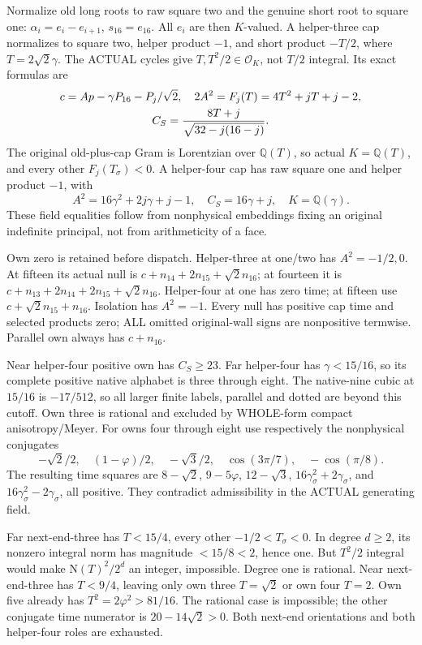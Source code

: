 \documentclass[11pt]{article}
\begin{document}
Normalize old long roots to raw square two and
the genuine short root to square one:
\(\alpha_i=e_i-e_{i+1}\), \(s_{16}=e_{16}\).
All \(e_i\) are then \(K\)-valued.
A helper-three cap normalizes to square two,
helper product \(-1\), and short product \(-T/2\),
where \(T=2\sqrt2\gamma\).
The ACTUAL cycles give
\(T,T^2/2\in\mathcal O_K\), not \(T/2\) integral.
Its exact formulas are
\[
 \begin{gathered}
 c=Ap-\gamma P_{16}-P_j/\sqrt2,\quad
 2A^2=F_j(T)=4T^2+jT+j-2,\\
 C_S={8T+j\over\sqrt{32-j(16-j)}} .
 \end{gathered}
\]
The original old-plus-cap Gram is Lorentzian over
\(\mathbb Q(T)\), so actual \(K=\mathbb Q(T)\),
and every other \(F_j(T_\sigma)<0\).
A helper-four cap has raw square one and helper
product \(-1\), with
\[
       A^2=16\gamma^2+2j\gamma+j-1,\quad
       C_S=16\gamma+j,\quad K=\mathbb Q(\gamma).
\]
These field equalities follow from nonphysical
embeddings fixing an original indefinite principal,
not from arithmeticity of a face.

Own zero is retained before dispatch.
Helper-three at one/two has \(A^2=-1/2,0\).
At fifteen its actual null is
\(c+n_{14}+2n_{15}+\sqrt2n_{16}\);
at fourteen it is
\(c+n_{13}+2n_{14}+2n_{15}+\sqrt2n_{16}\).
Helper-four at one has zero time;
at fifteen use \(c+\sqrt2n_{15}+n_{16}\).
Isolation has \(A^2=-1\).
Every null has positive cap time and selected
products zero; ALL omitted original-wall signs
are nonpositive termwise.
Parallel own always has \(c+n_{16}\).

Near helper-four positive own has \(C_S\ge23\).
Far helper-four has \(\gamma<15/16\), so its
complete positive native alphabet is
three through eight.
The native-nine cubic at \(15/16\) is
\(-17/512\), so all larger finite labels, parallel
and dotted are beyond this cutoff.
Own three is rational and excluded by WHOLE-form
compact anisotropy/Meyer.
For owns four through eight use respectively
the nonphysical conjugates
\[
 -\sqrt2/2,\quad(1-\varphi)/2,\quad-\sqrt3/2,\quad
 \cos(3\pi/7),\quad-\cos(\pi/8).
\]
The resulting time squares are
\(8-\sqrt2\), \(9-5\varphi\), \(12-\sqrt3\),
\(16\gamma_\sigma^2+2\gamma_\sigma\), and
\(16\gamma_\sigma^2-2\gamma_\sigma\), all positive.
They contradict admissibility in the ACTUAL
generating field.

Far next-end-three has
\(T<15/4\), every other \(-1/2<T_\sigma<0\).
In degree \(d\ge2\), its nonzero integral norm
has magnitude \(<15/8<2\), hence one.
But \(T^2/2\) integral would make
\(\mathrm N(T)^2/2^d\) an integer, impossible.
Degree one is rational.
Near next-end-three has \(T<9/4\), leaving only
own three \(T=\sqrt2\) or own four \(T=2\).
Own five already has \(T^2=2\varphi^2>81/16\).
The rational case is impossible; the other
conjugate time numerator is \(20-14\sqrt2>0\).
Both next-end orientations and both helper-four
roles are exhausted.
\end{document}
